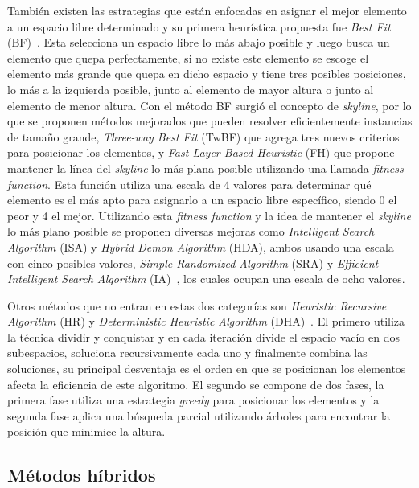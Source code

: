 \documentclass[letter, 10pt]{article}
\begin{document}
Tambi\'en existen las estrategias que est\'an enfocadas en asignar el mejor elemento a un espacio libre determinado y su primera heur\'istica propuesta fue \emph{Best Fit} (BF)~\cite{verstichel2013improved}. Esta selecciona un espacio libre lo m\'as abajo posible y luego busca un elemento que quepa perfectamente, si no existe este elemento se escoge el elemento m\'as grande que quepa en dicho espacio y tiene tres posibles posiciones, lo m\'as a la izquierda posible, junto al elemento de mayor altura o junto al elemento de menor altura. Con el m\'etodo BF surgi\'o el concepto de \emph{skyline}, por lo que se proponen m\'etodos mejorados que pueden resolver eficientemente instancias de tama\~no grande, \emph{Three-way Best Fit} (TwBF) que agrega tres nuevos criterios para posicionar los elementos, y \emph{Fast Layer-Based Heuristic} (FH) que propone mantener la l\'inea del \emph{skyline} lo m\'as plana posible utilizando una llamada \emph{fitness function}. Esta funci\'on utiliza una escala de 4 valores para determinar qu\'e elemento es el m\'as apto para asignarlo a un espacio libre espec\'ifico, siendo 0 el peor y 4 el mejor. Utilizando esta \emph{fitness function} y la idea de mantener el \emph{skyline} lo m\'as plano posible se proponen diversas mejoras como \emph{Intelligent Search Algorithm} (ISA) y \emph{Hybrid Demon Algorithm} (HDA), ambos usando una escala con cinco posibles valores, \emph{Simple Randomized Algorithm} (SRA) y \emph{Efficient Intelligent Search Algorithm} (IA)~\cite{wei2016efficient}, los cuales ocupan una escala de ocho valores.

Otros m\'etodos que no entran en estas dos categor\'ias son \emph{Heuristic Recursive Algorithm} (HR) y \emph{Deterministic Heuristic Algorithm} (DHA)~\cite{he2013heuristics}. El primero utiliza la t\'ecnica dividir y conquistar y en cada iteraci\'on divide el espacio vac\'io en dos subespacios, soluciona recursivamente cada uno y finalmente combina las soluciones, su principal desventaja es el orden en que se posicionan los elementos afecta la eficiencia de este algoritmo. El segundo se compone de dos fases, la primera fase utiliza una estrategia \emph{greedy} para posicionar los elementos y la segunda fase aplica una b\'usqueda parcial utilizando \'arboles para encontrar la posici\'on que minimice la altura. 

\subsection{M\'etodos h\'ibridos}
\end{document}
